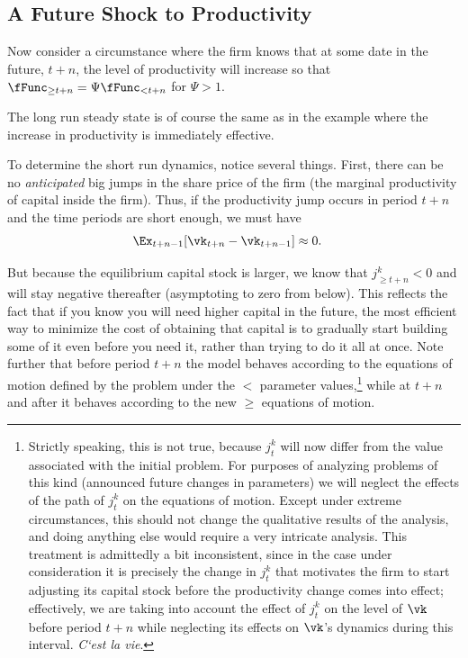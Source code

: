 \documentclass[headings=optiontotocandhead,toc=flat]{handout}
\begin{document}
\subsection[hypertarget={Future-Shock-To-Productivity}]{A Future Shock to Productivity}

Now consider a circumstance where the firm knows that at some date in the future, $t+n$, the level of productivity will increase so that $\fFunc_{\geq t+n} = \Psi \fFunc_{< t+n}$ for $\Psi>1$.

The long run steady state is of course the same as in the example where the increase in productivity is immediately effective.

To determine the short run dynamics, notice several things.  First, there can be no \emph{anticipated} big jumps in the share price of the firm (the marginal productivity of capital inside the firm).  Thus, if the productivity jump occurs in period $t+n$ and the time periods are short enough, we must have
\begin{equation}\begin{gathered}\begin{aligned}
      \Ex_{t+n-1}[\vk_{t+n}-\vk_{t+n-1}] & \approx  0.
    \end{aligned}\end{gathered}\end{equation}

But because the equilibrium capital stock is larger, we know that ${j}^{k}_{\geq t+n}<0$ and will stay negative thereafter (asymptoting to zero from below). This reflects the fact that if you know you will need higher capital in the future, the most efficient way to minimize the cost of obtaining that capital is to gradually start building some of it even before you need it, rather than trying to do it all at once. Note further that before period $t+n$ the model behaves according to the equations of motion defined by the problem under the ${<}$ parameter values,\footnote{Strictly speaking, this is not true, because $j_{t}^{k}$ will now differ from the value associated with the initial problem.  For purposes of analyzing problems of this kind (announced future changes in parameters) we will neglect the effects of the path of $j_{t}^{k}$ on the equations of motion.  Except under extreme circumstances, this should not change the qualitative results of the analysis, and doing anything else would require a very intricate analysis.  This treatment is admittedly a bit inconsistent, since in the case under consideration it is precisely the change in $j_{t}^{k}$ that motivates the firm to start adjusting its capital stock before the productivity change comes into effect; effectively, we are taking into account the effect of $j_{t}^{k}$ on the level of $\vk$ before period $t+n$ while neglecting its effects on $\vk$'s dynamics during this interval.  {\it C`est la vie}.} while at $t+n$ and after it behaves according to the new $\geq$ equations of motion.
\end{document}
